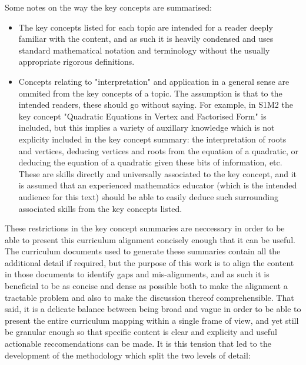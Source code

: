 \documentclass[twoside,12pt,a4paper]{report}
\begin{document}
Some notes on the way the key concepts are summarised:
\begin{itemize}
	\item The key concepts listed for each topic are intended for a reader deeply familiar with the content, and as such it is heavily condensed and uses standard mathematical notation and terminology without the usually appropriate rigorous definitions. 
	\item Concepts relating to "interpretation" and application in a general sense are ommited from the key concepts of a topic. The assumption is that to the intended readers, these should go without saying. For example, in S1M2 the key concept "Quadratic Equations in Vertex and Factorised Form" is included, but this implies a variety of auxillary knowledge which is not explicity included in the key concept summary: the interpretation of roots and vertices, deducing vertices and roots from the equation of a quadratic, or deducing the equation of a quadratic given these bits of information, etc. These are skills directly and universally associated to the key concept, and it is assumed that an experienced mathematics educator (which is the intended audience for this text) should be able to easily deduce such surrounding associated skills from the key concepts listed. 
\end{itemize}
These restrictions in the key concept summaries are neccessary in order to be able to present this curriculum alignment concisely enough that it can be useful. The curriculum documents used to generate these summaries contain all the additional detail if required, but the purpose of this work is to align the content in those documents to identify gaps and mis-alignments, and as such it is beneficial to be as concise and dense as possible both to make the alignment a tractable problem and also to make the discussion thereof comprehensible. That said, it is a delicate balance between being broad and vague in order to be able to present the entire curriculum mapping within a single frame of view, and yet still be granular enough so that specific content is clear and explicity and useful actionable reccomendations can be made. It is this tension that led to the development of the methodology which split the two levels of detail: 
\end{document}
